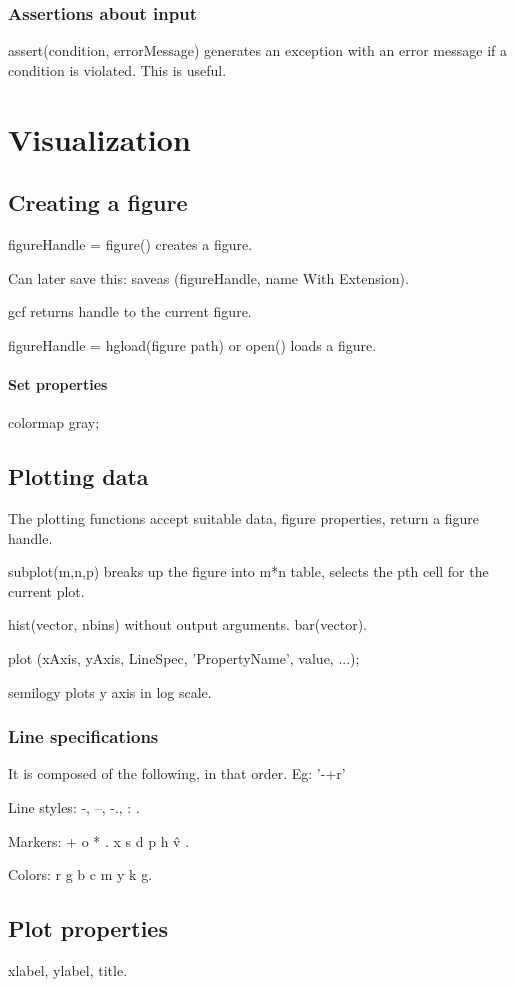\documentclass[oneside, article]{memoir}
\begin{document}
\subsubsection{Assertions about input}
assert(condition, errorMessage) generates an exception with an error message if a condition is violated. This is useful.


\section{Visualization}
\subsection{Creating a figure}
figureHandle = figure() creates a figure.

Can later save this: saveas (figureHandle, name With Extension).

gcf returns handle to the current figure.

figureHandle = hgload(figure path) or open() loads a figure.

\paragraph*{Set properties}
colormap gray;


\subsection{Plotting data}
The plotting functions accept suitable data, figure properties, return a figure handle.

subplot(m,n,p) breaks up the figure into m*n table, selects the pth cell for the current plot.

hist(vector, nbins) without output arguments. bar(vector).

plot (xAxis, yAxis, LineSpec, 'PropertyName', value, ...);

semilogy plots y axis in log scale.

\subsubsection{Line specifications}
It is composed of the following, in that order. Eg: '-+r'

Line styles: -, --, -., : .

Markers: + o * . x s d p h \^ v .

Colors: r g b c m y k g.


\subsection{Plot properties}
xlabel, ylabel, title.
\end{document}
